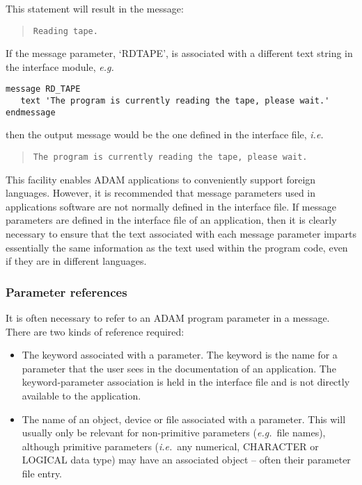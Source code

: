 \documentclass[twoside,11pt]{article}
\newcommand{\xlabel}[1]{}
\renewcommand{\_}{\texttt{\symbol{95}}}
\begin{document}
This statement will result in the message:

\begin {quote}
\begin {small}
\begin{verbatim}
Reading tape.
\end{verbatim}
\end {small}
\end {quote}

If the message parameter, `RD\_TAPE', is associated with a  different text
string in the interface module, \textit{e.g.}

\begin {small}
\begin{verbatim}
message RD_TAPE
   text 'The program is currently reading the tape, please wait.'
endmessage
\end{verbatim}
\end {small}

then the output message would be the one defined in the interface file, {\em
i.e.}

\begin {quote}
\begin {small}
\begin{verbatim}
The program is currently reading the tape, please wait.
\end{verbatim}
\end {small}
\end {quote}

This facility enables ADAM applications to conveniently support foreign
languages.
However, it is recommended that message parameters used in applications
software are not normally defined in the interface file.
If message parameters are defined in the interface file of an application,
then it is clearly necessary to ensure that the text associated with each
message parameter imparts essentially the same information as the text used
within the program code, even if they are in different languages.


\subsubsection{\xlabel{parameter_reefrences}Parameter references\label{parameter_references}}

It is often necessary to refer to an ADAM program parameter in a message.
There are two kinds of reference required:

\begin {itemize}
\item The keyword associated with a parameter.
The keyword is the name for a parameter that the user sees in the
documentation of an application.
The keyword-parameter association is held in the interface file and is
not directly available to the application.

\item The name of an object, device or file associated with a parameter.
This will usually only be relevant for non-primitive parameters
(\textit{e.g.}\ file names), although primitive parameters (\textit{i.e.}\ any
numerical, CHARACTER or LOGICAL data type) may have an associated object --
often their parameter file entry.
\end {itemize}
\end{document}
